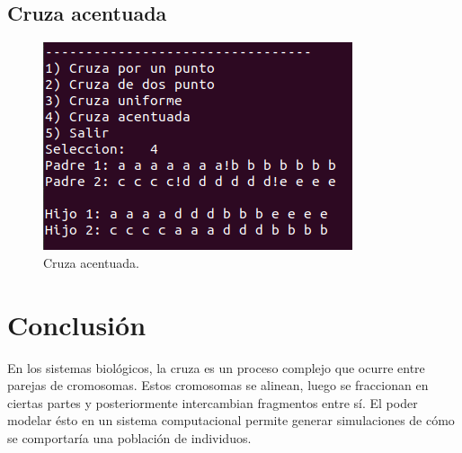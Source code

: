 \documentclass[11pt,letterpaper]{article}
\begin{document}
\subsection*{Cruza acentuada}

\begin{figure}[H]
	\centering
	\includegraphics[scale = 1]{images/acentuada}
	\caption{Cruza acentuada.}
\end{figure}


\section*{Conclusión}

En los sistemas biológicos, la cruza es un proceso complejo que ocurre entre parejas de cromosomas. Estos cromosomas se alinean, luego se fraccionan en ciertas
partes y posteriormente intercambian fragmentos entre sí. El poder modelar ésto en un sistema computacional permite generar simulaciones de cómo se comportaría una población de individuos.
\end{document}
